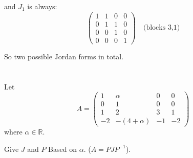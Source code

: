\documentclass[12pt]{article}
\begin{document}
\begin{correctionbox}
and $J_1$ is always:
\[
\begin{pmatrix} 1 & 1 & 0 & 0 \\ 0 & 1 & 1 & 0 \\ 0 & 0 & 1 & 0 \\ 0 & 0 & 0 & 1 \end{pmatrix} \quad \text{(blocks 3,1)}
\]

So two possible Jordan forms in total.
\end{correctionbox}

\section{}
Let $$A = \begin{pmatrix} 1 & \alpha & 0 & 0 \\ 0 & 1 & 0 & 0 \\ 1 & 2 & 3 & 1 \\ -2 & -(4 + \alpha) & -1 & -2\end{pmatrix}$$ where $\alpha \in \mathbb{R}$.

Give $J$ and $P$ Based on $\alpha$. ($A=PJP^{-1}$).
\end{document}
